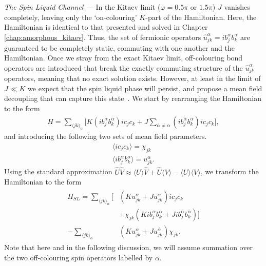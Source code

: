 {\it The Spin Liquid Channel ---} In the Kitaev limit ($\varphi = 0.5\pi $ or $1.5\pi$) $J$ vanishes completely, leaving only the `on-colouring' $K$-part of the Hamiltonian. Here, the Hamiltonian is identical to that presented and solved in Chapter \ref{chap:amorphous_kitaev}. Thus, the set of fermionic operators $\hat u_{jk}^\alpha = ib_j^\alpha b_k^\alpha$ are guaranteed to be completely static, commuting with one another and the Hamiltonian. Once we stray from the exact Kitaev limit, off-colouring bond operators are introduced that break the exactly commuting structure of the $\hat u_{jk}^\alpha$ operators, meaning that no exact solution exists. However, at least in the limit of $J \ll K$ we expect that the spin liquid phase will persist, and propose a mean field decoupling that can capture this state~\cite{schaffer_quantum_2012, knolle_dynamics_2018}. We start by rearranging the Hamiltonian to the form
\begin{align}
    H = \sum_{{\langle jk \rangle}_{\alpha}}
    \bigg [  
    K (i b^\alpha_j b^\alpha_k) i c_j c_k  
    + J \sum_{\bar \alpha \neq \alpha} 
    (i b^{\bar \alpha}_j b^{\bar \alpha}_k) i c_j c_k  
    \bigg ],
\end{align}
and introducing the following two sets of mean field parameters.
\begin{align}
    \langle i c_j c_k \rangle = \chi_{jk} \label{eqn:c_mean_field}\\ 
    \langle i b^\alpha_j b^\alpha_k \rangle = u_{jk}^\alpha.\label{eqn:b_mean_field}
\end{align}
Using the standard approximation $\hat U \hat V \approx \langle U \rangle \hat V + \hat  U \langle V \rangle  -  \langle U \rangle  \langle V \rangle$, we transform the Hamiltonian to the form
\begin{align}\label{eqn:mean_field_spin_liquid_ham}
    \begin{aligned}
    H_{SL} = \sum_{{\langle jk \rangle}_{\alpha}}
    \big[
     &\left(
    K u^\alpha_{jk} +J u^{\bar \alpha}_{jk}
    \right) 
    i c_j c_k \\
    &+ \chi_{jk} 
    ( Ki b^\alpha_j b^\alpha_k + J  ib^{\bar \alpha}_j b^{\bar \alpha}_k)\big] \\
    - \sum_{{\langle jk \rangle}_{\alpha}}
    &( K u^\alpha_{jk} + J u^{\bar \alpha}_{jk}  ) \chi_{jk}
    .    
    \end{aligned}
\end{align}
Note that here and in the following discussion, we will assume summation over the two off-colouring  spin operators labelled by $\bar \alpha$.

